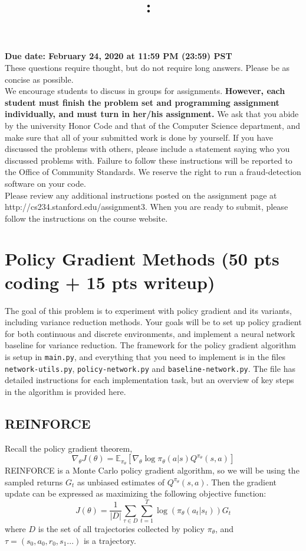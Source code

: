 \documentclass{article}
\title{
\vspace{-1in}
\textmd{\textbf{\hmwkClass:\ \hmwkTitle}}}
\author{}
\date{} %
\begin{document}
\maketitle
\vspace{-.5in}
\begin{framed}
{\bf Due date: February 24, 2020 at 11:59 PM (23:59) PST}
\\[1em]
These questions require thought, but do not require long answers. Please be as concise as possible.
\\[1em]
We encourage students to discuss in groups for assignments. \textbf{However, each student must finish the
problem set and programming assignment individually, and must turn in her/his assignment.} We ask
that you abide by the university Honor Code and that of the Computer Science department, and make
sure that all of your submitted work is done by yourself. If you have discussed the problems with others,
please include a statement saying who you discussed problems with. Failure to follow these instructions
will be reported to the Office of Community Standards. We reserve the right to run a fraud-detection software on your code.
\\[1em]
Please review any additional instructions posted on the assignment page at
http://cs234.stanford.edu/assignment3. When you are ready to submit, please
follow the instructions on the course website.
\\[1em]
\end{framed}


\section{Policy Gradient Methods (50 pts coding + 15 pts writeup)}
The goal of this problem is to experiment with policy gradient and its variants, including variance reduction methods. Your goals will be to set up policy gradient for both continuous and discrete environments, and implement a neural network baseline for variance reduction. The framework for the policy gradient algorithm is setup in \texttt{main.py}, and everything that you need to implement is in the files \texttt{network-utils.py}, \texttt{policy-network.py} and \texttt{baseline-network.py}. The file has detailed instructions for each implementation task, but an overview of key steps in the algorithm is provided here.
\subsection{REINFORCE}
Recall the policy gradient theorem,
\[ \nabla_\theta J(\theta) = \mathbb E_{\pi_\theta} \left[ \nabla_\theta \log\pi_\theta(a|s) Q^{\pi_\theta} (s,a) \right] \]
REINFORCE is a Monte Carlo policy gradient algorithm, so we will be using the sampled returns $G_t$ as unbiased estimates of $Q^{\pi_\theta}(s,a)$.
Then the gradient update can be expressed as maximizing the following objective function:
\[ J(\theta) = \frac{1}{|D|} \sum_{\tau \in D} \sum_{t=1}^T \log(\pi_\theta(a_t|s_t)) G_t \]
where $D$ is the set of all trajectories collected by policy $\pi_\theta$, and $\tau=(s_0, a_0, r_0,s_1...)$ is a trajectory.
\end{document}
